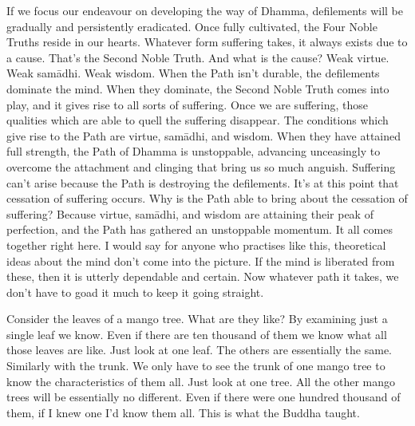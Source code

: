 If we focus our endeavour on developing the way of Dhamma, defilements will be gradually and persistently eradicated. Once fully cultivated, the Four Noble Truths reside in our hearts. Whatever form suffering takes, it always exists due to a cause. That's the Second Noble Truth. And what is the cause? Weak virtue. Weak sam\=adhi. Weak wisdom. When the Path isn't durable, the defilements dominate the mind. When they dominate, the Second Noble Truth comes into play, and it gives rise to all sorts of suffering. Once we are suffering, those qualities which are able to quell the suffering disappear. The conditions which give rise to the Path are virtue, sam\=adhi, and wisdom. When they have attained full strength, the Path of Dhamma is unstoppable, advancing unceasingly to overcome the attachment and clinging that bring us so much anguish. Suffering can't arise because the Path is destroying the defilements. It's at this point that cessation of suffering occurs. Why is the Path able to bring about the cessation of suffering? Because virtue, sam\=adhi, and wisdom are attaining their peak of perfection, and the Path has gathered an unstoppable momentum. It all comes together right here. I would say for anyone who practises like this, theoretical ideas about the mind don't come into the picture. If the mind is liberated from these, then it is utterly dependable and certain. Now whatever path it takes, we don't have to goad it much to keep it going straight. 

Consider the leaves of a mango tree. What are they like? By examining just a single leaf we know. Even if there are ten thousand of them we know what all those leaves are like. Just look at one leaf. The others are essentially the same. Similarly with the trunk. We only have to see the trunk of one mango tree to know the characteristics of them all. Just look at one tree. All the other mango trees will be essentially no different. Even if there were one hundred thousand of them, if I knew one I'd know them all. This is what the Buddha taught.

